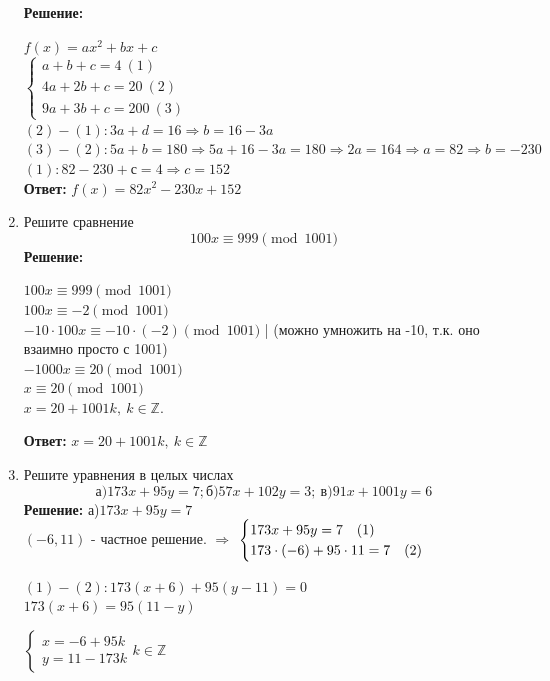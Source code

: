 \documentclass[]{book}
\theoremstyle{definition}
\newcommand{\bb}[1]{\mathbb{#1}}
\begin{document}
\begin{enumerate}
\textbf{Решение:}

$f(x) = ax^2+bx+c$\\
$
\begin{cases}
   a + b + c = 4\ (1)\\
   4a + 2b + c = 20\ (2) \\
   9a + 3b + c = 200\ (3)
 \end{cases}
$\\
 
$(2)-(1)\colon 3a + d = 16 \Longrightarrow b = 16 - 3a$\\
$(3)-(2)\colon 5a + b = 180 \Longrightarrow 5a + 16 - 3a = 180 \Longrightarrow 2a = 164 \Longrightarrow a = 82 \Longrightarrow b = -230$\\
$(1): 82 - 230 + с = 4 \Longrightarrow c = 152$\\
\textbf{Ответ: }$f(x) = 82x^2 - 230x + 152$

\item Решите сравнение 
$$100x \equiv 999 \pmod{1001}$$
\textbf{Решение:}

$100x \equiv 999 \pmod{1001}$\\
$100x \equiv -2 \pmod{1001}$\\
$-10\cdot100x \equiv -10\cdot(-2) \pmod{1001}$ | (можно умножить на -10, т.к. оно взаимно просто с 1001)\\ 
$-1000x \equiv 20 \pmod{1001}$\\
$x \equiv 20 \pmod{1001}$\\
$x = 20 + 1001k,\: k \in \bb{Z}$.

\textbf{Ответ:} $ x = 20 + 1001k,\: k \in \bb{Z}$


\item Решите уравнения в целых числах
$$ \text{а)}173x + 95y = 7; \text{б)}57x + 102y = 3;\ \text{в)}91x + 1001y = 6$$
\textbf{Решение:}
а)$173x + 95y = 7$\\
$(-6,11)$ - частное решение. $\Longrightarrow$
$
\begin{cases}
   173x + 95y = 7 \quad (1) \\
   173\cdot (-6) + 95\cdot 11 = 7\quad (2)
 \end{cases}\\
$

$(1) - (2)\colon 173(x+6) + 95(y-11) = 0$\\
$173(x+6) = 95(11-y)$
 
$
\begin{cases}
   x = -6 + 95k \\
   y = 11 - 173k
\end{cases}
k\in\bb{Z}$ \\


\end{enumerate}
\end{document}
